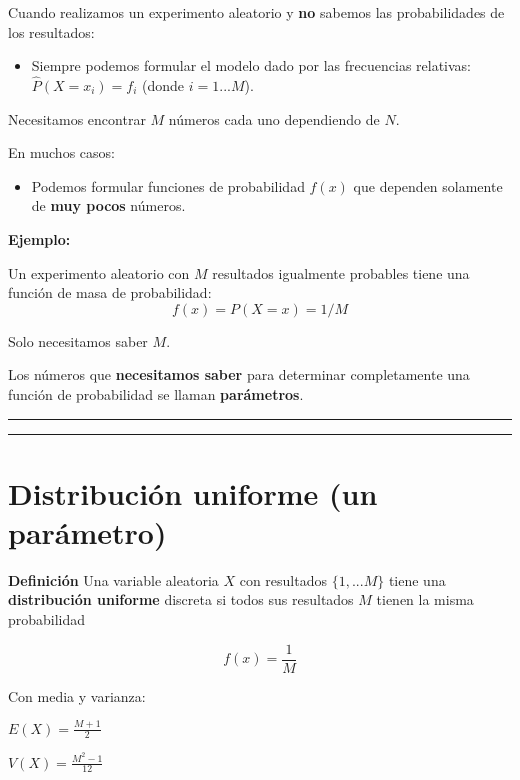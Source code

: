 \documentclass[
]{book}
\providecommand{\tightlist}{%
  \setlength{\itemsep}{0pt}\setlength{\parskip}{0pt}}
\begin{document}
Cuando realizamos un experimento aleatorio y \textbf{no} sabemos las probabilidades de los resultados:

\begin{itemize}
\tightlist
\item
  Siempre podemos formular el modelo dado por las frecuencias relativas: \(\hat{P}(X=x_i)=f_i\) (donde \(i=1...M\)).
\end{itemize}

Necesitamos encontrar \(M\) números cada uno dependiendo de \(N\).

En muchos casos:

\begin{itemize}
\tightlist
\item
  Podemos formular funciones de probabilidad \(f(x)\) que dependen solamente de \textbf{muy pocos} números.
\end{itemize}

\textbf{Ejemplo:}

Un experimento aleatorio con \(M\) resultados igualmente probables tiene una función de masa de probabilidad:
\[f(x)=P(X=x)=1/M\]

Solo necesitamos saber \(M\).

Los números que \textbf{necesitamos saber} para determinar completamente una función de probabilidad se llaman \textbf{parámetros}.

\begin{center}\rule{0.5\linewidth}{0.5pt}\end{center}

\begin{center}\rule{0.5\linewidth}{0.5pt}\end{center}

\hypertarget{distribuciuxf3n-uniforme-un-paruxe1metro}{%
\section{Distribución uniforme (un parámetro)}\label{distribuciuxf3n-uniforme-un-paruxe1metro}}

\textbf{Definición}
Una variable aleatoria \(X\) con resultados \(\{1,...M\}\) tiene una \textbf{distribución uniforme} discreta si todos sus resultados \(M\) tienen la misma probabilidad

\[f(x)=\frac{1}{M}\]

Con media y varianza:

\(E(X)= \frac{M+1}{2}\)

\(V(X)= \frac{M^2-1}{12}\)
\end{document}
